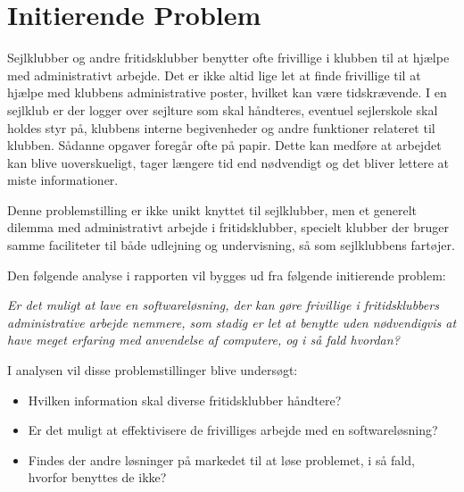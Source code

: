 \section{Initierende Problem}
Sejlklubber og andre fritidsklubber benytter ofte frivillige i klubben til at hjælpe med administrativt arbejde. Det er ikke altid lige let at finde frivillige til at hjælpe med klubbens administrative poster, hvilket kan være tidskrævende. I en sejlklub er der logger over sejlture som skal håndteres, eventuel sejlerskole skal holdes styr på, klubbens interne begivenheder og andre funktioner relateret til klubben. Sådanne opgaver foregår ofte på papir. Dette kan medføre at arbejdet kan blive uoverskueligt, tager længere tid end nødvendigt og det bliver lettere at miste informationer.

Denne problemstilling er ikke unikt knyttet til sejlklubber, men et generelt dilemma med administrativt arbejde i fritidsklubber, specielt klubber der bruger samme faciliteter til både udlejning og undervisning, så som sejlklubbens fartøjer. 

Den følgende analyse i rapporten vil bygges ud fra følgende initierende problem:

\textit{Er det muligt at lave en softwareløsning, der kan gøre frivillige i fritidsklubbers administrative arbejde nemmere, som stadig er let at benytte uden nødvendigvis at have meget erfaring med anvendelse af computere, og i så fald hvordan?}

I analysen vil disse problemstillinger blive undersøgt:
\begin{itemize}
\item Hvilken information skal diverse fritidsklubber håndtere?
\item Er det muligt at effektivisere de frivilliges arbejde med en softwareløsning?
\item Findes der andre løsninger på markedet til at løse problemet, i så fald, hvorfor benyttes de ikke?
\end{itemize}
